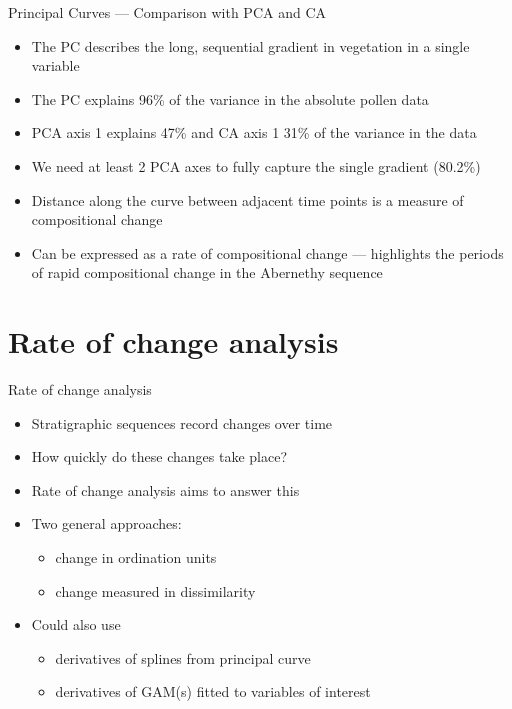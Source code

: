 \documentclass[10pt,ignorenonframetext,compress, aspectratio=169]{beamer}
\providecommand{\tightlist}{%
  \setlength{\itemsep}{0pt}\setlength{\parskip}{0pt}}
\begin{document}
\begin{frame}{Principal Curves --- Comparison with PCA and CA}

\begin{itemize}
\tightlist
\item
  The PC describes the long, sequential gradient in vegetation in a
  single variable
\item
  The PC explains 96\% of the variance in the absolute pollen data
\item
  PCA axis 1 explains 47\% and CA axis 1 31\% of the variance in the
  data
\item
  We need at least 2 PCA axes to fully capture the single gradient
  (80.2\%)
\item
  Distance along the curve between adjacent time points is a measure of
  compositional change
\item
  Can be expressed as a rate of compositional change --- highlights the
  periods of rapid compositional change in the Abernethy sequence
\end{itemize}

\end{frame}

\section{Rate of change analysis}\label{rate-of-change-analysis}

\begin{frame}{Rate of change analysis}

\begin{itemize}
\tightlist
\item
  Stratigraphic sequences record changes over time
\item
  How quickly do these changes take place?
\item
  Rate of change analysis aims to answer this
\item
  Two general approaches:

  \begin{itemize}
  \tightlist
  \item
    change in ordination units
  \item
    change measured in dissimilarity
  \end{itemize}
\item
  Could also use

  \begin{itemize}
  \tightlist
  \item
    derivatives of splines from principal curve
  \item
    derivatives of GAM(s) fitted to variables of interest
  \end{itemize}
\end{itemize}

\end{frame}
\end{document}
